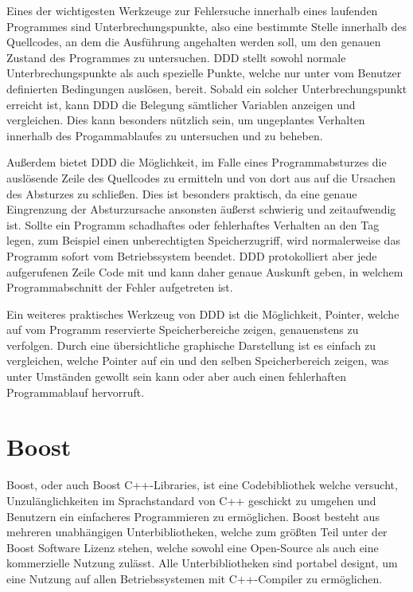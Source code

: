 Eines der wichtigesten Werkzeuge zur Fehlersuche innerhalb eines laufenden Programmes sind Unterbrechungspunkte, also eine bestimmte Stelle innerhalb des Quellcodes, an dem die Ausführung angehalten werden 
soll, um den genauen Zustand des Programmes zu untersuchen. DDD stellt sowohl normale Un\-ter\-brech\-ungs\-pun\-kte als auch spezielle Punkte, welche nur unter vom Benutzer definierten Bedingungen auslösen, bereit.
Sobald ein solcher Un\-ter\-brech\-ungs\-pun\-kt erreicht ist, kann DDD die Belegung sämtlicher Variablen anzeigen und vergleichen. Dies kann besonders nützlich sein, um ungeplantes Verhalten innerhalb des
Progamm\-ablaufes zu untersuchen und zu beheben. 

Außerdem bietet DDD die Möglichkeit, im Falle eines Programmabsturzes die auslösende Zeile des Quellcodes zu ermitteln und von dort aus auf die Ursachen des Absturzes zu schließen. Dies ist besonders
praktisch, da eine genaue Eingrenzung der Absturzursache ansonsten äußerst schwierig und zeitaufwendig ist. Sollte ein Programm schadhaftes oder fehlerhaftes Verhalten an den Tag legen, zum Beispiel einen unberechtigten Speicherzugriff,
wird normalerweise das Programm sofort vom Betriebssystem beendet. DDD protokolliert aber jede aufgerufenen Zeile Code mit und kann daher genaue Auskunft geben, in welchem Programmabschnitt der
Fehler aufgetreten ist.

Ein weiteres praktisches Werkzeug von DDD ist die Möglichkeit, Pointer, welche auf vom Programm reservierte Speicherbereiche zeigen, genauenstens zu verfolgen. Durch eine übersichtliche graphische Darstellung
ist es einfach zu vergleichen, welche Pointer auf ein und den selben Speicherbereich zeigen, was unter Umständen gewollt sein kann oder aber auch einen fehlerhaften Programmablauf hervorruft.

\section{Boost}
\label{sec:boost}
Boost, oder auch Boost C++-Libraries, ist eine Codebibliothek welche versucht, Un\-zu\-läng\-lich\-keiten im Sprachstandard von C++ geschickt zu umgehen und Benutzern ein einfacheres Programmieren zu ermöglichen.
Boost besteht aus mehreren unabhängigen Unterbibliotheken, welche zum größten Teil unter der Boost Software Lizenz stehen, welche sowohl eine Open-Source als auch eine kommerzielle Nutzung zulässt. Alle
Unterbibliotheken sind portabel designt, um eine Nutzung auf allen Betriebssystemen mit C++-Compiler zu ermöglichen. 

